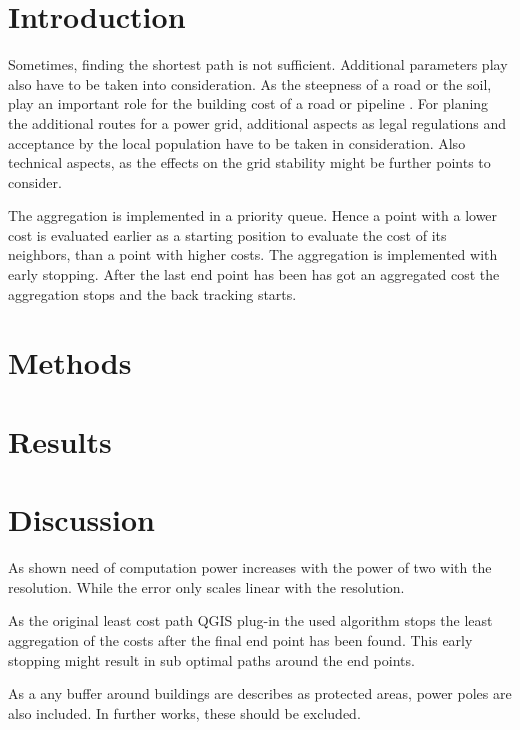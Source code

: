 \documentclass[acmtog]{acmart}
\begin{document}
	\section{Introduction}\label{sec:introduction}

	Sometimes, finding the shortest path is not sufficient.
	Additional parameters play also have to be taken into consideration.
	As the steepness of a road or the soil, play an important role for the building cost of a road or pipeline
	.
	For planing the additional routes for a power grid, additional aspects as legal regulations and acceptance
	by the local population have to be taken in consideration.
	Also technical aspects, as the effects on the grid stability might be further points to consider.\cite{schafer_understanding_2022}

	The aggregation is implemented in a priority queue. 
	Hence a point with a lower cost is evaluated earlier as a starting position to evaluate the cost of its neighbors, than a point with higher costs.
	The aggregation is implemented with early stopping. 
	After the last end point has been has got an aggregated cost the aggregation stops and the back tracking starts.
	

	\section{Methods}\label{sec:methods}
	

	\section{Results}\label{sec:results}
	

	\section{Discussion}\label{sec:discussion}
	As shown need of computation power increases with the power of two with the resolution.
	While the error only scales linear with the resolution.
	
	As the original least cost path QGIS plug-in the used algorithm stops the least aggregation of the costs after the final end point has been found.
	This early stopping might result in sub optimal paths around the end points.
	
	As a any buffer around buildings are describes as protected areas, power poles are also included.
	In further works, these should be excluded.
	
\end{document}
